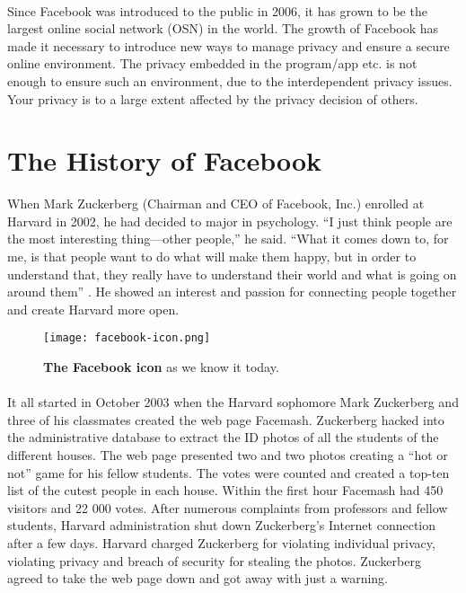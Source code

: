 \paragraph{}
Since Facebook was introduced to the public in 2006, it has grown to be the largest online social network (OSN) in the world. The growth of Facebook has made it necessary to introduce new ways to manage privacy and ensure a secure online environment. The privacy embedded in the program/app etc. is not enough to ensure such an environment, due to the interdependent privacy issues. Your privacy is to a large extent affected by the privacy decision of others. 


\section{The History of Facebook}
\label{sec:facebookhistory}
When Mark Zuckerberg (Chairman and CEO of Facebook, Inc.) enrolled at Harvard in 2002, he had decided to major in psychology. “I just think people are the most interesting thing—other people,” he said. “What it comes down to, for me, is that people want to do what will make them happy, but in order to understand that, they really have to understand their world and what is going on around them” \cite{MeMedia}. He showed an interest and passion for connecting people together and create Harvard more open. 

\begin{figure}[h!]
\centering
\texttt{[image: facebook-icon.png]}
\caption[Facebook icon]{\textbf{The Facebook icon} as we know it today.}
\end{figure}

\paragraph{}
It all started in October 2003 when the Harvard sophomore Mark Zuckerberg and three of his classmates created the web page Facemash. Zuckerberg hacked into the administrative database to extract the ID photos of all the students of the different houses. The web page presented two and two photos creating a “hot or not” game for his fellow students. The votes were counted and created a top-ten list of the cutest people in each house. Within the first hour Facemash had 450 visitors and 22 000 votes. After numerous complaints from professors and fellow students, Harvard administration shut down Zuckerberg's Internet connection after a few days. Harvard charged Zuckerberg for violating individual privacy, violating privacy and breach of security for stealing the photos. Zuckerberg agreed to take the web page down and got away with just a warning.

